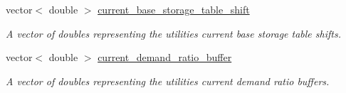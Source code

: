 \begin{DoxyCompactItemize}
vector$<$ double $>$ \mbox{\hyperlink{classContinuityModelROF_acaebccba4f4ed286c5da02d6c2c90605}{current\+\_\+base\+\_\+storage\+\_\+table\+\_\+shift}}
\begin{DoxyCompactList}\small\item\em A vector of doubles representing the utilities\textquotesingle{} current base storage table shifts. \end{DoxyCompactList}\item 
vector$<$ double $>$ \mbox{\hyperlink{classContinuityModelROF_a1a274033b741e664268515de8e8eb3bc}{current\+\_\+demand\+\_\+ratio\+\_\+buffer}}
\begin{DoxyCompactList}\small\item\em A vector of doubles representing the utilities\textquotesingle{} current demand ratio buffers. \end{DoxyCompactList}\end{DoxyCompactItemize}

